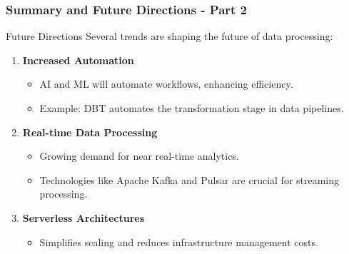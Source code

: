 \documentclass[aspectratio=169]{beamer}
\begin{document}
\begin{frame}[fragile]
    \frametitle{Summary and Future Directions - Part 2}
    \begin{block}{Future Directions}
        Several trends are shaping the future of data processing:
    \end{block}
    
    \begin{enumerate}
        \item \textbf{Increased Automation}
        \begin{itemize}
            \item AI and ML will automate workflows, enhancing efficiency.
            \item Example: DBT automates the transformation stage in data pipelines.
        \end{itemize}

        \item \textbf{Real-time Data Processing}
        \begin{itemize}
            \item Growing demand for near real-time analytics.
            \item Technologies like Apache Kafka and Pulsar are crucial for streaming processing.
        \end{itemize}

        \item \textbf{Serverless Architectures}
        \begin{itemize}
            \item Simplifies scaling and reduces infrastructure management costs.
        \end{itemize}
    \end{enumerate}
\end{frame}
\end{document}
